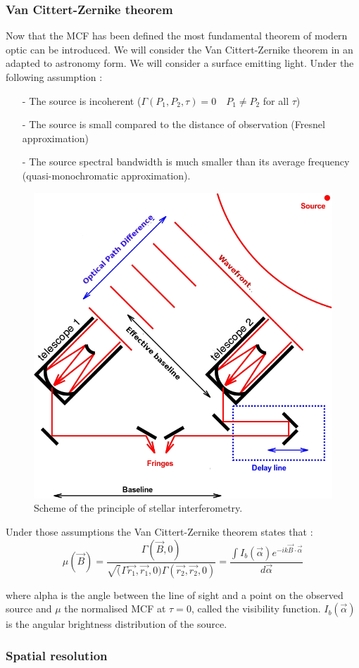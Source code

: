	\subsubsection{Van Cittert-Zernike theorem}
Now that the MCF has been defined the most fundamental theorem of modern optic can be introduced. We will consider the Van Cittert-Zernike theorem in an adapted to astronomy form. We will consider a surface emitting light. Under the following assumption :
\begin{itemize}
\item[-]The source is incoherent ($\Gamma(P_1,P_2,\tau) = 0 \quad P_1 \neq P_2$ for all $\tau$)
\item[-]The source is small compared to the distance of observation (Fresnel approximation)
\item[-]The source spectral bandwidth is much smaller than its average frequency (quasi-monochromatic approximation).
\end{itemize}

\begin{figure}[htbp!]
\centering
\includegraphics[scale=.3]{../images/scheme.png}
\caption{Scheme of the principle of stellar interferometry. }
\end{figure}

Under those assumptions the Van Cittert-Zernike theorem states that :
$$
\mu(\vec{B}) = \frac{\Gamma(\vec{B},0)}{\sqrt(\Gamma{\vec{r_1},\vec{r_1},0)\Gamma(\vec{r_2},\vec{r_2},0)}} = \frac{\int I_b(\vec{\alpha}) e^{-ik\vec{B} \cdot \vec{\alpha}}}{d\vec{\alpha}}
$$

where alpha is the angle between the line of sight and a point on the observed source and $\mu$ the normalised MCF at $\tau=0$, called the visibility function. $I_b(\vec{\alpha})$ is the angular brightness distribution of the source. 

	\subsubsection{Spatial resolution}